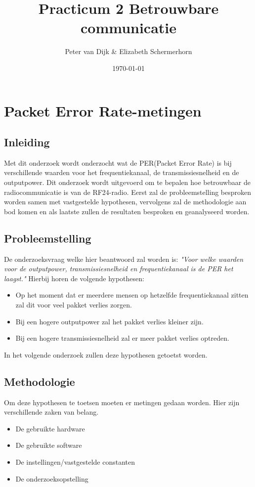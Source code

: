 \documentclass{article}
\author{Peter van Dijk \& Elizabeth Schermerhorn}
\date{\today}
\title{Practicum 2 Betrouwbare communicatie}
\begin{document}
\maketitle
\newpage
\tableofcontents
\clearpage
\section{Packet Error Rate-metingen}
\subsection{Inleiding}
	\hspace{6ex}  Met dit onderzoek wordt onderzocht wat de PER(Packet Error Rate) is bij verschillende waarden voor het frequentiekanaal, de transmissiesnelheid en de outputpower. Dit onderzoek wordt uitgevoerd om te bepalen hoe betrouwbaar de radiocommunicatie is van de RF24-radio. Eerst zal de probleemstelling besproken worden samen met vastgestelde hypothesen, vervolgens zal de methodologie aan bod komen en als laatste zullen de resultaten besproken en geanalyseerd worden. 
\subsection{Probleemstelling}
\hspace{4ex} De onderzoeksvraag welke hier beantwoord zal worden is: \textit{"Voor welke waarden voor de outputpower, transmissiesnelheid en frequentiekanaal is de PER het laagst."} Hierbij horen de volgende hypothesen: 
\begin{itemize}
  \item Op het moment dat er meerdere mensen op hetzelfde frequentiekanaal zitten zal dit voor veel pakket verlies zorgen.
  \item Bij een hogere outputpower zal het pakket verlies kleiner zijn.
  \item Bij een hogere transmissiesnelheid zal er meer pakket verlies optreden. 
\end{itemize}
In het volgende onderzoek zullen deze hypothesen getoetst worden.
\subsection{Methodologie}
\hspace{4ex} Om deze hypothesen te toetsen moeten er metingen gedaan worden. Hier zijn verschillende zaken van belang. 
\begin{itemize}
	\item De gebruikte hardware
	\item De gebruikte software
	\item De instellingen/vastgestelde constanten
	\item De onderzoeksopstelling
\end{itemize}
\end{document}
